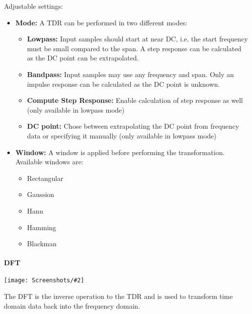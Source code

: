 \documentclass[a4paper,11pt]{article}
\newcommand{\screenshot}[2]{\begin{center}
\texttt{[image: Screenshots/\#2]}
\end{center}}
\begin{document}
Adjustable settings:
\begin{itemize}
\item \textbf{Mode:} A TDR can be performed in two different modes:
\begin{itemize}
\item \textbf{Lowpass:} Input samples should start at near DC, i.e. the start frequency must be small compared to the span. A step response can be calculated as the DC point can be extrapolated.
\item \textbf{Bandpass:} Input samples may use any frequency and span. Only an impulse response can be calculated as the DC point is unknown.
\item \textbf{Compute Step Response:} Enable calculation of step response as well (only available in lowpass mode)
\item \textbf{DC point:} Chose between extrapolating the DC point from frequency data or specifying it manually (only available in lowpass mode)
\end{itemize}
\item \textbf{Window:} A window is applied before performing the transformation. Available windows are:
\begin{itemize}
\item Rectangular
\item Gaussion
\item Hann
\item Hamming
\item Blackman
\end{itemize}
\end{itemize}
\paragraph{DFT}
\screenshot{0.4}{MathOpDFT.png}
The DFT is the inverse operation to the TDR and is used to transform time domain data back into the frequency domain.
\end{document}
